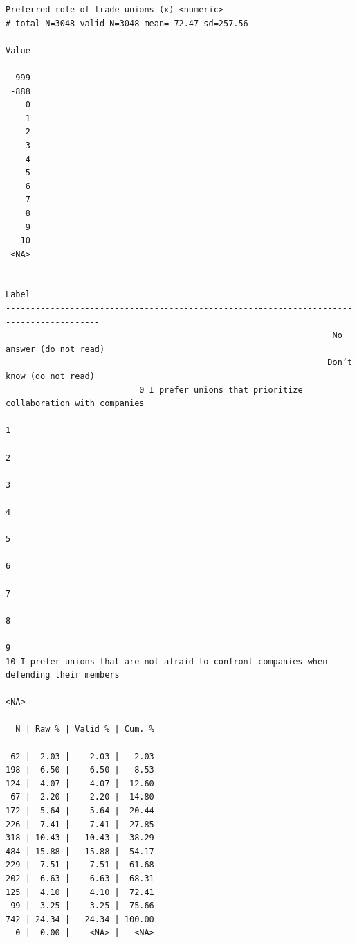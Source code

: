 \documentclass[
  letterpaper,
  DIV=11,
  numbers=noendperiod]{scrreprt}
\newenvironment{Shaded}{\begin{snugshade}}{\end{snugshade}}
\newcommand{\AttributeTok}[1]{\textcolor[rgb]{0.40,0.45,0.13}{#1}}
\newcommand{\FunctionTok}[1]{\textcolor[rgb]{0.28,0.35,0.67}{#1}}
\newcommand{\NormalTok}[1]{\textcolor[rgb]{0.00,0.23,0.31}{#1}}
\newcommand{\OtherTok}[1]{\textcolor[rgb]{0.00,0.23,0.31}{#1}}
\newcommand{\SpecialCharTok}[1]{\textcolor[rgb]{0.37,0.37,0.37}{#1}}
\newcommand{\StringTok}[1]{\textcolor[rgb]{0.13,0.47,0.30}{#1}}
\begin{document}
\begin{verbatim}
Preferred role of trade unions (x) <numeric> 
# total N=3048 valid N=3048 mean=-72.47 sd=257.56

Value
-----
 -999
 -888
    0
    1
    2
    3
    4
    5
    6
    7
    8
    9
   10
 <NA>

                                                                                    Label
-----------------------------------------------------------------------------------------
                                                                  No answer (do not read)
                                                                 Don’t know (do not read)
                           0 I prefer unions that prioritize collaboration with companies
                                                                                        1
                                                                                        2
                                                                                        3
                                                                                        4
                                                                                        5
                                                                                        6
                                                                                        7
                                                                                        8
                                                                                        9
10 I prefer unions that are not afraid to confront companies when defending their members
                                                                                     <NA>

  N | Raw % | Valid % | Cum. %
------------------------------
 62 |  2.03 |    2.03 |   2.03
198 |  6.50 |    6.50 |   8.53
124 |  4.07 |    4.07 |  12.60
 67 |  2.20 |    2.20 |  14.80
172 |  5.64 |    5.64 |  20.44
226 |  7.41 |    7.41 |  27.85
318 | 10.43 |   10.43 |  38.29
484 | 15.88 |   15.88 |  54.17
229 |  7.51 |    7.51 |  61.68
202 |  6.63 |    6.63 |  68.31
125 |  4.10 |    4.10 |  72.41
 99 |  3.25 |    3.25 |  75.66
742 | 24.34 |   24.34 | 100.00
  0 |  0.00 |    <NA> |   <NA>
\end{verbatim}

\begin{Shaded}
\end{Shaded}
\end{document}

